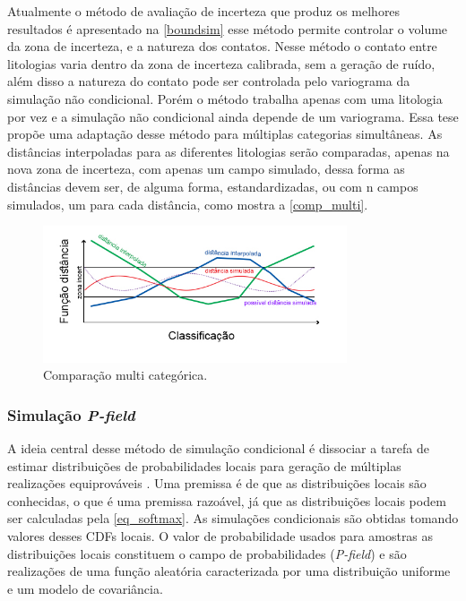 Atualmente o método de avaliação de incerteza que produz os melhores resultados é apresentado na \autoref{boundsim} esse método permite controlar o volume da zona de incerteza, e a natureza dos contatos. Nesse método o contato entre litologias varia dentro da zona de incerteza calibrada, sem a geração de ruído, além disso a natureza do contato pode ser controlada pelo variograma da simulação não condicional. Porém o método trabalha apenas com uma litologia por vez e a simulação não condicional ainda depende de um variograma. Essa tese propõe uma adaptação desse método para múltiplas categorias simultâneas. As distâncias interpoladas para as diferentes litologias serão comparadas, apenas na nova zona de incerteza, com apenas um campo simulado, dessa forma as distâncias devem ser, de alguma forma, estandardizadas, ou com n campos simulados, um para cada distância, como mostra a \autoref{comp_multi}.

\begin{figure}[!ht]
	\caption{\label{comp_multi}Comparação multi categórica.}
	\begin{center}
		\includegraphics[width=0.8\textwidth]{capitulo_3/classificacao_multi.jpg}
	\end{center}
\end{figure}

\subsubsection{Simulação \textit{P-field}}

A ideia central desse método de simulação condicional é dissociar a tarefa de estimar distribuições de probabilidades locais para geração de múltiplas realizações equiprováveis \cite{froidevaux1993probability}. Uma premissa é de que as distribuições locais são conhecidas, o que é uma premissa razoável, já que as distribuições locais podem ser calculadas pela \autoref{eq_softmax}. As simulações condicionais são obtidas tomando valores desses CDFs locais. O valor de probabilidade usados para amostras as distribuições locais constituem o campo de probabilidades (\textit{P-field}) e são realizações de uma função aleatória caracterizada por uma distribuição uniforme e um modelo de covariância.

